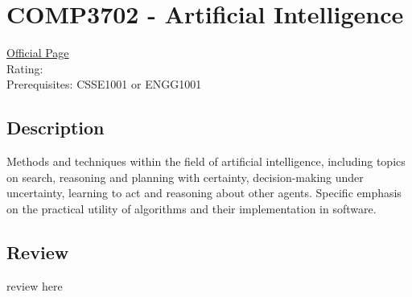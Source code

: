 \hypertarget{COMP3702}{\section{COMP3702 - Artificial Intelligence}}

\large
\textcolor{turbo_purple}{\href{https://my.uq.edu.au/programs-courses/course.html?course_code=COMP3702}{Official Page}} \\
Rating: \cstar\cstar\cstar\cstar\ostar \\
Prerequisites: CSSE1001 or ENGG1001

\normalsize
\subsection*{Description}
Methods and techniques within the field of artificial intelligence, including topics on search, reasoning and planning with certainty, decision-making under uncertainty, learning to act and reasoning about other agents.
Specific emphasis on the practical utility of algorithms and their implementation in software.

\subsection*{Review}
review here
